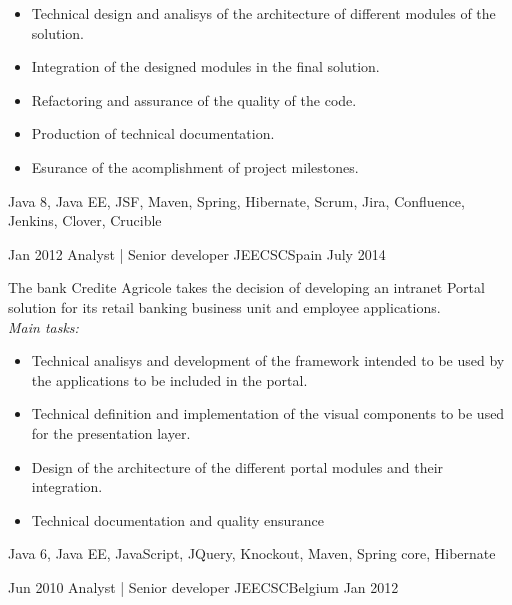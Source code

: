 \begin{experiences}
{                      \begin{itemize}
                        \item Technical design and analisys of the architecture of different modules of the solution.
                        \item Integration of the designed modules in the final solution.                
                        \item Refactoring and assurance of the quality of the code.
                        \item Production of technical documentation.
                        \item Esurance of the acomplishment of project milestones.
                      \end{itemize}
                    }
                    {Java 8, Java EE, JSF, Maven, Spring, Hibernate, Scrum, Jira, Confluence, Jenkins, Clover, Crucible}
                    
  \emptySeparator
  
    \experience
    {Jan 2012} {Analyst | Senior developer JEE}{CSC}{Spain}
    {July 2014}    {

The bank Credite Agricole takes the decision of developing an intranet Portal solution for its
retail banking business unit and employee applications.
\\
\emph{Main tasks:}    	
                      \begin{itemize}
                        \item Technical analisys and development of the framework intended to be used by the applications to be included in the portal.
                        \item Technical definition and implementation of the visual components to be used for the presentation layer.                   
                        \item Design of the architecture of the different portal modules and their integration.
                        \item Technical documentation and quality ensurance
                      \end{itemize}
                    }
                    {Java 6, Java EE, JavaScript, JQuery, Knockout, Maven, Spring core, Hibernate}
                    
  \emptySeparator
  
  
  \experience
    {Jun 2010} {Analyst | Senior developer JEE}{CSC}{Belgium}
    {Jan 2012}    {

}
\end{experiences}
